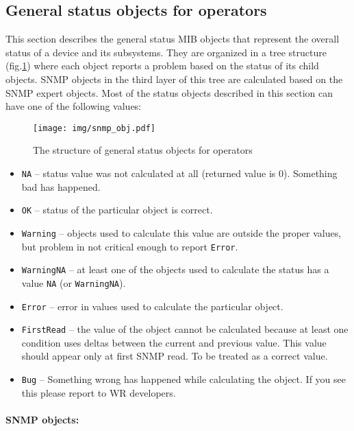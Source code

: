\subsection{General status objects for operators}
\label{sec:snmp_exports:basic}
This section describes the general status MIB objects that represent the overall
status of a device and its subsystems. They are organized in a tree structure
(fig.\ref{fig:snmp_oper}) where each object reports a problem based on the
status of its child objects. SNMP objects in the third layer of this tree are
calculated based on the SNMP expert objects. Most of the status objects
described in this section can have one of the following values:
\begin{figure}[ht]
  \begin{center}
    \texttt{[image: img/snmp\_obj.pdf]}
    \caption{The structure of general status objects for operators}
    \label{fig:snmp_oper}
  \end{center}
\end{figure}
\begin{itemize}%
  \item \texttt{NA} -- status value was not calculated at all (returned value
    is 0). Something bad has happened.
  \item \texttt{OK} -- status of the particular object is correct.
  \item \texttt{Warning} -- objects used to calculate this value are outside the
    proper values, but problem in not critical enough to report \texttt{Error}.
  \item \texttt{WarningNA} -- at least one of the objects used to calculate the
    status has a value \texttt{NA} (or \texttt{WarningNA}).
  \item \texttt{Error} -- error in values used to calculate the particular
    object.
  \item \texttt{FirstRead} -- the value of the object cannot be calculated
    because at least one condition uses deltas between the current and previous
    value. This value should appear only at first SNMP read. To be treated as a
    correct value.
  \item \texttt{Bug} -- Something wrong has happened while calculating the
    object. If you see this please report to WR developers.
\end{itemize}

\paragraph*{SNMP objects:}

